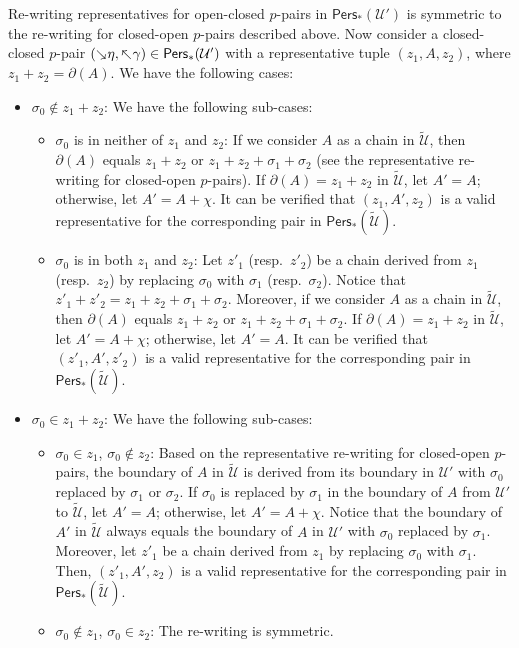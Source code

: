 \documentclass[letterpaper,11pt]{article}
\theoremstyle{mythmstyle}
\theoremstyle{mydefstyle}
\theoremstyle{plain}
\theoremstyle{definition}
\newcommand{\Pers}{\mathsf{Pers}}
\newcommand{\<}[1]{\langle #1\rangle}
\newcommand{\add}[1]{\mskip-2.5mu\rotatebox[origin=c]{-45}{${\rightarrow}$}{#1}}
\newcommand{\del}[1]{\mskip-2.5mu\rotatebox[origin=c]{-45}{${\leftarrow}$}{#1}}
\newcommand{\Ucal}{\mathcal{U}}
\newcommand{\sG}{\sigma}
\newcommand{\Dim}{p}
\newcommand{\extsimp}{\chi}
\begin{document}
Re-writing representatives for open-closed $\Dim$-pairs in 
$\Pers_*(\Ucal')$ is symmetric to the re-writing for closed-open $\Dim$-pairs
described above.
Now consider a  closed-closed $\Dim$-pair $(\add{\eta},\del{\gamma})\in\Pers_*(\Ucal')$
with a representative tuple $(z_1,A,z_2)$,
where $z_1+z_2=\partial(A)$.
We have the following cases:
\begin{itemize}
    \item $\sG_0\not\in z_1+z_2$:
    We have
    the following sub-cases:
    \begin{itemize}
        \item $\sG_0$ is in neither of $z_1$ and $z_2$:
        If we consider $A$ as a chain in $\tilde{\Ucal}$,
    then $\partial(A)$  equals $z_1+z_2$ 
    or $z_1+z_2+\sG_1+\sG_2$ (see the representative re-writing for 
    closed-open $\Dim$-pairs). 
    If $\partial(A)=z_1+z_2$ in $\tilde{\Ucal}$, let $A'=A$;
    otherwise, let $A'=A+\extsimp$.
    It can  be verified that
    $(z_1,A',z_2)$ is a valid
    representative for the corresponding pair in
    $\Pers_*(\tilde{\Ucal})$.

        \item
    $\sG_0$ is in both $z_1$ and $z_2$:
    Let $z'_1$ (resp.\ $z'_2$) be a chain derived from $z_1$ (resp.\ $z_2$)
    by replacing $\sG_0$ with $\sG_1$ (resp.\ $\sG_2$).
    Notice that $z'_1+z'_2=z_1+z_2+\sG_1+\sG_2$.
    Moreover,
    if we consider $A$ as a chain in $\tilde{\Ucal}$,
    then $\partial(A)$  equals $z_1+z_2$ 
    or $z_1+z_2+\sG_1+\sG_2$.
    If $\partial(A)=z_1+z_2$ in $\tilde{\Ucal}$, let $A'=A+\extsimp$;
    otherwise, let $A'=A$.
    It can  be verified that
    $(z'_1,A',z'_2)$ is a valid
    representative for the corresponding pair in
    $\Pers_*(\tilde{\Ucal})$.
        \end{itemize}
    
    \item $\sG_0\in z_1+z_2$:
    We have
    the following sub-cases:
    \begin{itemize}
    \item $\sG_0\in z_1$, $\sG_0\not\in z_2$: 
    Based on the representative re-writing for 
    closed-open $\Dim$-pairs,
    the boundary of $A$ in $\tilde{\Ucal}$
    is derived from
    its boundary in $\Ucal'$ with $\sG_0$  replaced by $\sG_1$
    or $\sG_2$.
    If $\sG_0$ is replaced by $\sG_1$ in the boundary of $A$
    from $\Ucal'$ to $\tilde{\Ucal}$, 
    let $A'=A$;
    otherwise, let $A'=A+\extsimp$.
    Notice that 
    the boundary of $A'$ in $\tilde{\Ucal}$ always equals
    the boundary of $A$ in ${\Ucal}'$
    with $\sG_0$  replaced by $\sG_1$.
    Moreover, let $z'_1$ be a chain derived from $z_1$ 
    by replacing $\sG_0$ with $\sG_1$.
    Then, $(z'_1,A',z_2)$ is a valid
    representative for the corresponding pair in
    $\Pers_*(\tilde{\Ucal})$.
    
    \item $\sG_0\not\in z_1$, $\sG_0\in z_2$: 
    The re-writing is symmetric.
    \end{itemize}
\end{itemize}
\end{document}
